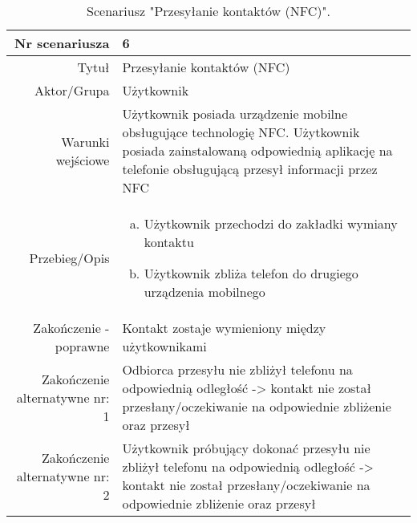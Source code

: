 \documentclass[12pt,a4paper]{article}
\begin{document}
\begin{table} [H]
\centering
\begin{tabular}{|r|p{9cm}|} \hline
Nr scenariusza & 6 \\
\hline
Tytuł & Przesyłanie kontaktów (NFC) \\
\hline
Aktor/Grupa & Użytkownik \\
\hline
Warunki wejściowe & Użytkownik posiada urządzenie mobilne obsługujące technologię NFC. 
Użytkownik posiada zainstalowaną odpowiednią aplikację na telefonie obsługującą przesył informacji przez NFC
 \\
\hline
Przebieg/Opis & 
\begin{enumerate}[a)]
\item Użytkownik przechodzi do zakładki wymiany kontaktu
\item Użytkownik zbliża telefon do drugiego urządzenia mobilnego
\end{enumerate}
\\
\hline
Zakończenie - poprawne & Kontakt zostaje wymieniony między użytkownikami
\\ 
\hline
Zakończenie alternatywne nr: 1 & Odbiorca przesyłu nie zbliżył telefonu na odpowiednią odległość -> kontakt nie został przesłany/oczekiwanie na odpowiednie zbliżenie oraz przesył
\\
\hline
Zakończenie alternatywne nr: 2 & Użytkownik próbujący dokonać przesyłu nie zbliżył telefonu na odpowiednią odległość -> kontakt nie został przesłany/oczekiwanie na odpowiednie zbliżenie oraz przesył
\\
\hline
\end{tabular}
\caption{Scenariusz "Przesyłanie kontaktów (NFC)".}
\label{table:6}
\end{table}
\end{document}
